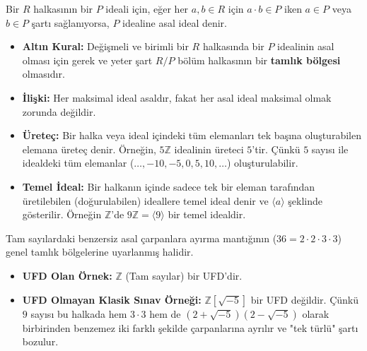 \documentclass[11pt, a4paper]{article}
\begin{document}
\begin{konubox}[title=\faBook\enspace 4. Asal İdeal (Prime Ideal)]
Bir $R$ halkasının bir $P$ ideali için, eğer her $a, b \in R$ için $a \cdot b \in P$ iken $a \in P$ veya $b \in P$ şartı sağlanıyorsa, $P$ idealine asal ideal denir.
\begin{itemize}
    \item \textbf{Altın Kural:} Değişmeli ve birimli bir $R$ halkasında bir $P$ idealinin asal olması için gerek ve yeter şart $R/P$ bölüm halkasının bir \textbf{tamlık bölgesi} olmasıdır.
    \item \textbf{İlişki:} Her maksimal ideal asaldır, fakat her asal ideal maksimal olmak zorunda değildir.
\end{itemize}
\end{konubox}

\begin{konubox}[title=\faBook\enspace 5. Üreteç ve Temel İdealler]
\begin{itemize}
    \item \textbf{Üreteç:} Bir halka veya ideal içindeki tüm elemanları tek başına oluşturabilen elemana üreteç denir. Örneğin, $5\mathbb{Z}$ idealinin üreteci $5$'tir. Çünkü $5$ sayısı ile idealdeki tüm elemanlar ($\dots, -10, -5, 0, 5, 10, \dots$) oluşturulabilir.
    \item \textbf{Temel İdeal:} Bir halkanın içinde sadece tek bir eleman tarafından üretilebilen (doğurulabilen) ideallere temel ideal denir ve $\langle a \rangle$ şeklinde gösterilir. Örneğin $\mathbb{Z}$'de $9\mathbb{Z} = \langle 9 \rangle$ bir temel idealdir.
\end{itemize}
\end{konubox}

\begin{konubox}[title=\faBook\enspace 6. UFD (Tek Türlü Çarpanlara Ayrılma Bölgesi)]
Tam sayılardaki benzersiz asal çarpanlara ayırma mantığının ($36 = 2 \cdot 2 \cdot 3 \cdot 3$) genel tamlık bölgelerine uyarlanmış halidir.
\begin{itemize}
    \item \textbf{UFD Olan Örnek:} $\mathbb{Z}$ (Tam sayılar) bir UFD'dir.
    \item \textbf{UFD Olmayan Klasik Sınav Örneği:} $\mathbb{Z}[\sqrt{-5}]$ bir UFD değildir. Çünkü $9$ sayısı bu halkada hem $3 \cdot 3$ hem de $(2+\sqrt{-5})(2-\sqrt{-5})$ olarak birbirinden benzemez iki farklı şekilde çarpanlarına ayrılır ve "tek türlü" şartı bozulur.
\end{itemize}
\end{konubox}
\end{document}
